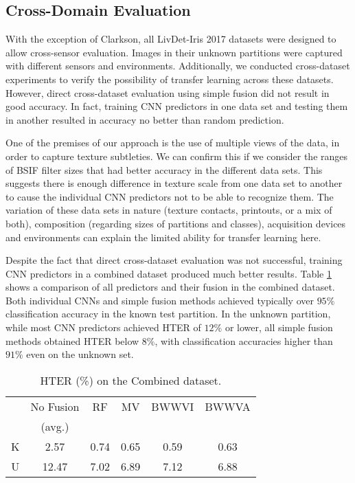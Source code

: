 \subsection{Cross-Domain Evaluation}
\label{sec:cross_dataset_evaluation}

With the exception of Clarkson, all LivDet-Iris 2017 datasets were designed to allow cross-sensor evaluation. Images in their unknown partitions were captured with different sensors and environments. Additionally, we conducted cross-dataset experiments to verify the possibility of transfer learning across these datasets. However, direct cross-dataset evaluation using simple fusion did not result in good accuracy. In fact, training CNN predictors in one data set and testing them in another resulted in accuracy no better than random prediction.

One of the premises of our approach is the use of multiple views of the data, in order to capture texture subtleties. We can confirm this if we consider the ranges of BSIF filter sizes that had better accuracy in the different data sets. This suggests there is enough difference in texture scale from one data set to another to cause the individual CNN predictors not to be able to recognize them. The variation of these data sets in nature (texture contacts, printouts, or a mix of both), composition (regarding sizes of partitions and classes), acquisition devices and environments can explain the limited ability for transfer learning here.

Despite the fact that direct cross-dataset evaluation was not successful, training CNN predictors in a combined dataset produced much better results. Table \ref{tab:combined_results} shows a comparison of all predictors and their fusion in the combined dataset. Both individual CNNs and simple fusion methods achieved typically over $95\%$ classification accuracy in the known test partition. In the unknown partition, while most CNN predictors achieved HTER of $12\%$ or lower, all simple fusion methods obtained HTER below $8\%$, with classification accuracies higher than $91\%$ even on the unknown set. 

\begin{table}[!ht]
\centering
\caption{HTER (\%) on the Combined dataset.}
\label{tab:combined_results}
\begin{tabular}{c|ccccc}
\hline
  &No Fusion & RF    & MV    & BWWVI & BWWVA \\
  &(avg.) \\ \hline
K & 2.57  & 0.74  & 0.65  & 0.59  & 0.63 \\
U & 12.47 & 7.02  & 6.89  & 7.12  & 6.88 \\ \hline
\end{tabular}
\end{table}

